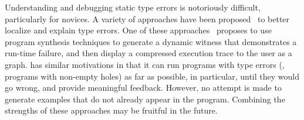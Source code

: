 




Understanding and debugging static type errors is notoriously difficult,
particularly for novices.
%
A variety of approaches have been
proposed~\cite{Seminal,ChenErwig2014,Pavlinovic2015,sherrloc} to better localize
and explain type errors.
%
One of these approaches~\cite{Seidel2016} proposes to use program synthesis techniques to generate a dynamic witness
that demonstrates a run-time failure, and then display a compressed execution
trace to the user as a graph.
%
\HazelnutLive{} has similar motivations in that it can run programs with type errors (\ie{}, programs with
non-empty holes) as far as possible, in particular, until they
would go wrong, and provide meaningful feedback. However, no attempt is made to generate examples that do not already appear in the program. 
%
Combining the strengths of these approaches may be fruitful in the future. 

